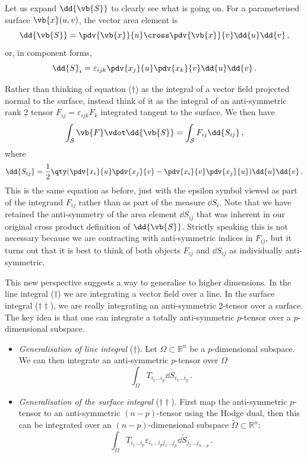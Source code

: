 \documentclass{article}
\theoremstyle{plain}\theoremheaderfont{\normalfont\itshape}\theorembodyfont{\rmfamily}\theoremseparator{.}\newtheorem*{rem}{Remark}\newtheorem*{ex}{Example}\newtheorem*{proof}{Proof}\newtheorem*{altp}{Alternative proof}
\theoremstyle{plain}\theoremheaderfont{\normalfont\bfseries}\theorembodyfont{\rmfamily}\theoremseparator{.}\newtheorem{thm}{Theorem}[section]\newtheorem{lem}[thm]{Lemma}\newtheorem{prop}[thm]{Proposition}\newtheorem*{cor}{Corollary}\newtheorem{defn}[thm]{Definition}\newtheorem{clm}[thm]{Claim}\newtheorem{clminproof}{Claim}
\theoremstyle{break}\theoremheaderfont{\normalfont\itshape}\theorembodyfont{\rmfamily}\theoremseparator{.\medskip}\newtheorem*{proofskip}{Proof}\newtheorem*{exs}{Examples}\newtheorem*{rems}{Remarks}
\theoremstyle{break}\theoremheaderfont{\normalfont\bfseries}\theorembodyfont{\rmfamily}\theoremseparator{.\medskip}\newtheorem{lemskip}[thm]{Lemma}\newtheorem{defnskip}[thm]{Definition}\newtheorem{propskip}[thm]{Proposition}\newtheorem{thmskip}[thm]{Theorem}
\numberwithin{equation}{section}
\begin{document}
	Let us expand \(\dd{\vb{S}}\) to clearly see what is going on. For a parameterised surface \(\vb{x}(u,v)\), the vector area element is
	\[\dd{\vb{S}}=\pdv{\vb{x}}{u}\cross\pdv{\vb{x}}{v}\dd{u}\dd{v}\,,\]
	or, in component forms,
	\[\dd{S}_i=\varepsilon_{ijk}\pdv{x_j}{u}\pdv{x_k}{v}\dd{u}\dd{v}\,.\]

	Rather than thinking of equation (\(\dagger\)) as the integral of a vector field projected normal to the surface, instead think of it as the integral of an anti-symmetric rank 2 tensor \(F_{ij}=\varepsilon_{ijk}F_{k}\) integrated tangent to the surface. We then have
	\[\int_{\mathcal{S}}\vb{F}\vdot\dd{\vb{S}}=\int_\mathcal{S}F_{ij}\dd{S_{ij}}\,,\]
	where
	\[\dd{S_{ij}}=\frac{1}{2}\qty(\pdv{x_i}{u}\pdv{x_j}{v}-\pdv{x_i}{v}\pdv{x_j}{u})\dd{u}\dd{v}\,.\]
	This is the same equation as before, just with the epsilon symbol viewed as part of the integrand \(F_{ij}\) rather than as part of the measure \(\dd{S_i}\). Note that we have retained the anti-symmetry of the area element \(\dd{S_{ij}}\) that was inherent in our original cross product definition of \(\dd{\vb{S}}\). Strictly speaking this is not necessary because we are contracting with anti-symmetric indices in \(F_{ij}\), but it turns out that it is best to think of both objects \(F_{ij}\) and \(\dd{S_{ij}}\) as individually anti-symmetric.

	This new perspective suggests a way to generalise to higher dimensions. In the line integral (\(\dagger\)) we are integrating a vector field over a line. In the surface integral (\(\dagger\dagger\)), we are really integrating an anti-symmetric 2-tensor over a surface. The key idea is that one can integrate a totally anti-symmetric \(p\)-tensor over a \(p\)-dimensional subspace.

	\begin{itemize}
		\item \textit{Generalisation of line integral} (\(\dagger\)). Let \(\Omega\subset\mathbb{R}^n\) be a \(p\)-dimensional subspace. We can then integrate an anti-symmetric \(p\)-tensor over \(\Omega\)
		\[\int_\Omega T_{i_1\dots i_p}\dd{S_{i_1\dots i_p}}\,.\]
		\item \textit{Generalisation of the surface integral} (\(\dagger\dagger\)). First map the anti-symmetric \(p\)-tensor to an anti-symmetric \((n-p)\)-tensor using the Hodge dual, then this can be integrated over an \((n-p)\)-dimensional subspace \(\tilde{\Omega}\subset\mathbb{R}^n\):
		\[\int_{\tilde{\Omega}}T_{i_1\dots i_p}\varepsilon_{i_1\dots i_p j_1\dots j_p}\dd{\tilde{S}_{j_1\dots j_{n-p}}}\,.\]
	\end{itemize}
\end{document}
